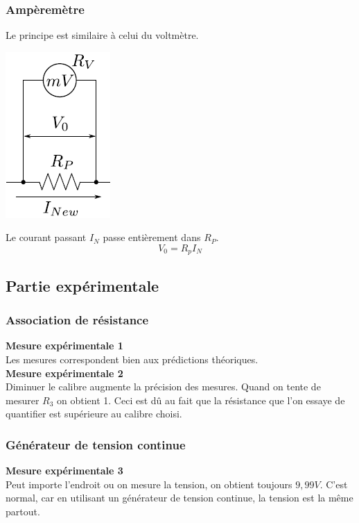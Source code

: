 \documentclass	[11pt, a4paper, openany]{book}
\begin{document}
\subsubsection*{Ampèremètre}
Le principe est similaire à celui du voltmètre.
\begin{center}
\includegraphics[scale=0.5]{labo/image12.png}
\end{center}
Le courant passant $I_N$ passe entièrement dans $R_P$.
\begin{equation}
V_0 = R_pI_N
\end{equation}

\subsection{Partie expérimentale}
\subsubsection*{Association de résistance}
\textbf{Mesure expérimentale 1}\\
Les mesures correspondent bien aux prédictions théoriques.\\

\textbf{Mesure expérimentale 2}\\
Diminuer le calibre augmente la précision des mesures. Quand on tente de mesurer $R_3$ on obtient 1. Ceci est dû au fait que la résistance que l'on essaye de quantifier est supérieure au calibre choisi.

\subsubsection*{Générateur de tension continue}
\textbf{Mesure expérimentale 3}\\
Peut importe l'endroit ou on mesure la tension, on obtient toujours $9,99 V$. C'est normal, car en utilisant un générateur de tension continue, la tension est la même partout.
\end{document}
